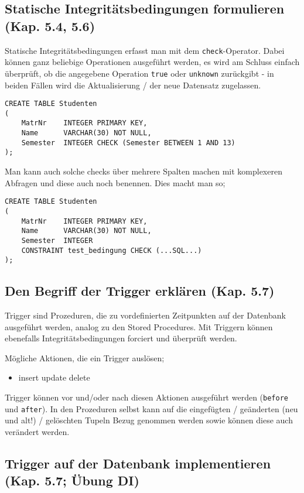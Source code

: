 \subsection{Statische Integritätsbedingungen formulieren (Kap. 5.4, 5.6)}
Statische Integritätsbedingungen erfasst man mit dem \texttt{check}-Operator. Dabei können ganz beliebige Operationen ausgeführt werden, es wird am Schluss einfach überprüft, ob die angegebene Operation \texttt{true} oder \texttt{unknown} zurückgibt - in beiden Fällen wird die Aktualisierung / der neue Datensatz zugelassen.
\begin{lstlisting}[caption={Beispiel mit check}]
CREATE TABLE Studenten
(
    MatrNr    INTEGER PRIMARY KEY,
    Name      VARCHAR(30) NOT NULL,
    Semester  INTEGER CHECK (Semester BETWEEN 1 AND 13)
);
\end{lstlisting}

Man kann auch solche checks über mehrere Spalten machen mit komplexeren Abfragen und diese auch noch benennen. Dies macht man so;

\begin{lstlisting}[caption={Beispiel mit check und Constraint}]
CREATE TABLE Studenten
(
    MatrNr    INTEGER PRIMARY KEY,
    Name      VARCHAR(30) NOT NULL,
    Semester  INTEGER
    CONSTRAINT test_bedingung CHECK (...SQL...)
);
\end{lstlisting}

\subsection{Den Begriff der Trigger erklären (Kap. 5.7)}
Trigger sind Prozeduren, die zu vordefinierten Zeitpunkten auf der Datenbank ausgeführt werden, analog zu den Stored Procedures. Mit Triggern können ebenefalls Integritätsbedingungen forciert und überprüft werden.

Mögliche Aktionen, die ein Trigger auslösen;
\begin{itemize}
  \item insert
  \insert update
  \insert delete
\end{itemize}

Trigger können vor und/oder nach diesen Aktionen ausgeführt werden (\texttt{before} und \texttt{after}). In den Prozeduren selbst kann auf die eingefügten / geänderten (neu und alt!) / gelöschten Tupeln Bezug genommen werden sowie können diese auch verändert werden.

\subsection{Trigger auf der Datenbank implementieren (Kap. 5.7; Übung DI)}

